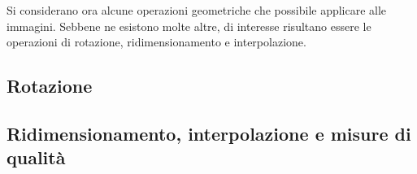 \documentclass{subfiles}
\begin{document}
Si considerano ora alcune operazioni geometriche che possibile applicare alle immagini.
Sebbene ne esistono molte altre, di interesse risultano essere le operazioni di rotazione, ridimensionamento e interpolazione.

\subsection{Rotazione}

\clearpage

\subsection{Ridimensionamento, interpolazione e misure di qualità}

\end{document}

